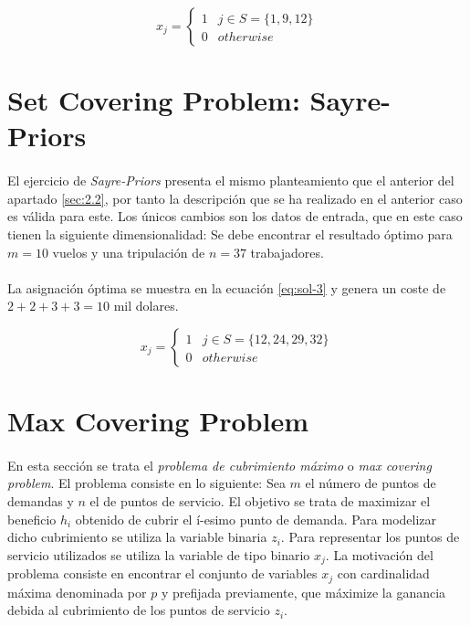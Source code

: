 \documentclass[spanish]{article}
\begin{document}
			\begin{equation}
			\label{eq:sol-2.2}
				x_{j} =
					\begin{cases}
		      	1 & j \in S = \{ 1, 9, 12  \} \\
		      	0 & otherwise
			   	\end{cases}
			\end{equation}


	\section{Set Covering Problem: Sayre-Priors}
	\label{sec:3}

		\paragraph{}
		El ejercicio de \emph{Sayre-Priors} presenta el mismo planteamiento que el anterior del apartado \ref{sec:2.2}, por tanto la descripción que se ha realizado en el anterior caso es válida para este. Los únicos cambios son los datos de entrada, que en este caso tienen la siguiente dimensionalidad: Se debe encontrar el resultado óptimo para $m = 10$ vuelos y una tripulación de $n = 37$ trabajadores.

		\paragraph{}
		La asignación óptima se muestra en la ecuación \eqref{eq:sol-3} y genera un coste de $2 + 2 + 3 + 3 = 10 $ mil dolares.

\begin{equation}
		\label{eq:sol-3}
			x_{j} =
				\begin{cases}
					1 & j \in S = \{ 12, 24, 29, 32  \} \\
					0 & otherwise
				\end{cases}
		\end{equation}


	\section{Max Covering Problem}
	\label{sec:4}

		\paragraph{}
		En esta sección se trata el \emph{problema de cubrimiento máximo} o \emph{max covering problem}. El problema consiste en lo siguiente: Sea $m$ el número de puntos de demandas y $n$ el de puntos de servicio. El objetivo se trata de maximizar el beneficio $h_i$ obtenido de cubrir el í-esimo punto de demanda. Para modelizar dicho cubrimiento se utiliza la variable binaria $z_i$. Para representar los puntos de servicio utilizados se utiliza la variable de tipo binario $x_j$. La motivación del problema consiste en encontrar el conjunto de variables $x_j$ con cardinalidad máxima denominada por $p$ y prefijada previamente, que máximize la ganancia debida al cubrimiento de los puntos de servicio $z_i$.
\end{document}
